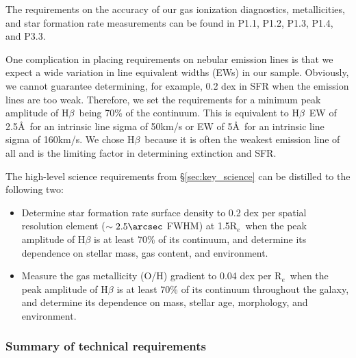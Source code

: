 \documentclass[preprint,11pt]{aastex}
\newcommand{\Hbeta}{{H$\beta$}}
\newcommand{\Reff}{{R$_{e}$}}
\begin{document}
The requirements on the accuracy of our gas ionization diagnostics,
metallicities, and star formation rate measurements can be found in
P1.1, P1.2, P1.3, P1.4, and P3.3.

One complication in placing requirements on nebular emission lines is
that we expect a wide variation in line equivalent widths (EWs) in our
sample. Obviously, we cannot guarantee determining, for example, 0.2
dex in SFR when the emission lines are too weak. Therefore, we set the
requirements for a minimum peak amplitude of \Hbeta\ being 70\% of the
continuum. This is equivalent to \Hbeta\ EW of 2.5\AA\ for an
intrinsic line sigma of 50km/s or EW of 5\AA\ for an intrinsic line
sigma of 160km/s. We chose \Hbeta\ because it is often the weakest
emission line of all and is the limiting factor in determining
extinction and SFR.

The high-level science requirements from \S\ref{sec:key_science} can be distilled to the following two:

\begin{itemize}
\item Determine star formation rate surface density to 0.2 dex per
  spatial resolution element ($\sim2.5\arcsec$ FWHM) at 1.5\Reff\ when
  the peak amplitude of H$\beta$ is at least 70\% of its continuum,
  and determine its dependence on stellar mass, gas content, and
  environment.

\item Measure the gas metallicity (O/H) gradient to 0.04 dex per
  \Reff\ when the peak amplitude of H$\beta$ is at least 70\% of its
  continuum throughout the galaxy, and determine its dependence on
  mass, stellar age, morphology, and environment.
\end{itemize}

\subsubsection{Summary of technical requirements}
\end{document}
